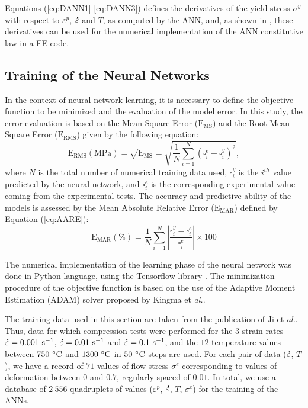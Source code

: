 \documentclass[algorithms,article,submit,pdftex,moreauthors]{Definitions/mdpi}
\makeatletter
\DeclareRobustCommand{\mdot}[1]{\accentset{\mbox{\bfseries .}}{#1}}
\DeclareRobustCommand{\eal}{et \emph{al.}\@\xspace}
\DeclareRobustCommand{\MSE}{\text{E}_\text{MS}}
\DeclareRobustCommand{\RMSE}{\text{E}_\text{RMS}}
\DeclareRobustCommand{\MARE}{\text{E}_\text{MAR}}
\DeclareRobustCommand{\ps}{\text{s}^{-1}}
\DeclareRobustCommand{\MPa}{\text{MPa}}
\makeatother
\begin{document}
Equations (\ref{eq:DANN1}-\ref{eq:DANN3}) defines the derivatives of the yield stress $\sigma^y$ with respect to $\varepsilon^p$, $\mdot\varepsilon$ and $T$, as computed by the ANN, and, as shown in \cite{Pantale-2021}, these derivatives can be used for the numerical implementation of the ANN constitutive law in a FE code.

\subsection{Training of the Neural Networks}\label{sec:ANN-traning}

In the context of neural network learning, it is necessary to define the objective function to be minimized and the evaluation of the model error.
In this study, the error evaluation is based on the Mean Square Error ($\MSE$) and the Root Mean Square Error ($\RMSE$) given by the following equation:
\begin{equation}
\RMSE (\MPa) = \sqrt{\MSE} = \sqrt{\frac{1}{N} \sum_{i=1}^{N} \left(\square_i^e - \square_i^y\right)^2}, \label{eq:RMSE}
\end{equation}
where $N$ is the total number of numerical training data used, $\square_i^y$ is the $i^{th}$ value predicted by the neural network, and $\square_i^e$ is the corresponding experimental value coming from the experimental tests.
The accuracy and predictive ability of the models is assessed by the Mean Absolute Relative Error ($\MARE$) defined by Equation (\ref{eq:AARE}):
\begin{equation}
\MARE(\%) = \frac{1}{N} \sum_{i=1}^{N}{\left|\frac{\square_i^y -\square_i^e}{\square_i^e}\right|} \times 100 \label{eq:AARE}
\end{equation}

The numerical implementation of the learning phase of the neural network was done in Python language, using the Tensorflow library \cite{Abadi-2016, Mattmann-2020}.
The minimization procedure of the objective function is based on the use of the Adaptive Moment Estimation (ADAM) solver proposed by Kingma \eal \cite{Kingma-2015}.

The training data used in this section are taken from the publication of Ji \eal \cite{Ji-2018}.
Thus, data for which compression tests were performed for the $3$ strain rates $\mdot\varepsilon=0.001~\ps$, $\mdot\varepsilon=0.01~\ps$ and $\mdot\varepsilon=0.1~\ps$, and the $12$ temperature values between $750~\celsius$ and $1300~\celsius$ in $50~\celsius$ steps are used.
For each pair of data ($\mdot\varepsilon$, $T$), we have a record of $71$ values of flow stress $\sigma^e$ corresponding to values of deformation between $0$ and $0.7$, regularly spaced of $0.01$.
In total, we use a database of $2~556$ quadruplets of values ($\varepsilon^p$, $\mdot\varepsilon$, $T$, $\sigma^e$) for the training of the ANNs.
\end{document}
